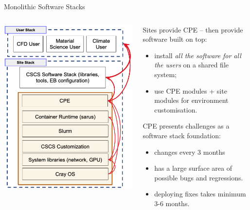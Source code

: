 \documentclass[aspectratio=43]{beamer}
\begin{document}
\begin{frame}[fragile]{Monolithic Software Stacks}
    \begin{columns}[T]
        \begin{column}{0.5\textwidth}
            \includegraphics[width=\textwidth]{images/stack-old.png}
        \end{column}
        \begin{column}{0.5\textwidth}

            \small

            Sites provide CPE -- then provide software built on top:
            \begin{itemize}
                \item install \emph{all the software for all the users} on a shared file system;
                \item use CPE modules + site modules for environment customisation.
            \end{itemize}

            CPE presents challenges as a software stack foundation:
            \begin{itemize}
                \item changes every 3 months 
                \item has a large surface area of possible bugs and regressions.
                \item deploying fixes takes minimum 3-6 months.
            \end{itemize}
        \end{column}
    \end{columns}
\end{frame}
\end{document}
